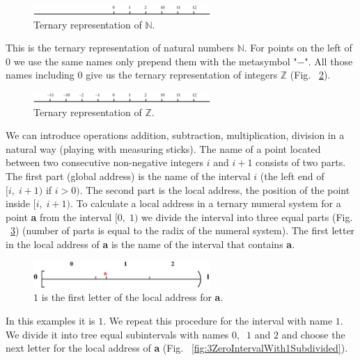 \documentclass[color=black,11pt]{elegantpaper}
\begin{document}
\begin{figure}[htbp]
  \centering
  \includegraphics[width=0.6\textwidth]{xfig_stuff/3natural.eps}
  \caption{Ternary representation of $\mathbb{N}.$} 
  \label{fig:3natural}
\end{figure}

 This is the ternary representation of natural numbers $\mathbb{N}.$ For points on the left of $0$ we use the same names only prepend them with the metasymbol "$-$". All those names including $0$ give us the ternary representation of integers $\mathbb{Z}$ (Fig. ~\ref{fig:3integers}).
\begin{figure}[htbp]
  \centering
  \includegraphics[width=0.6\textwidth]{xfig_stuff/3integers.eps}
  \caption{Ternary representation of $\mathbb{Z}.$} 
  \label{fig:3integers}
\end{figure}
We can introduce operations addition, subtraction, multiplication, division in a natural way (playing with measuring sticks).
The name of a point located between two consecutive non-negative integers $i$ and $i+1$ consists of two parts. The first part (global address) is the name of the interval $i$ (the left end of $[i,\; i+1)$ if $i>0).$ The second part is the local address, the position of the point inside $[i,\;i+1).$ 
To calculate a local address in a ternary numeral system for a point {\bf \color{red} a} from the interval $[0,\;1)$ we divide the interval into three equal parts (Fig. ~\ref{fig:3ZeroInterval}) (number of parts is equal to the radix of the numeral system). The first letter in the local address of {\bf \color{red} a} is the name of the interval that contains {\bf \color{red} a}.
\begin{figure}[htbp]
  \centering
  \includegraphics[width=0.6\textwidth]{xfig_stuff/3ZeroInterval.eps}
  \caption{$1$ is the first letter of the local address for {\bf \color{red} a}.} 
  \label{fig:3ZeroInterval}
\end{figure}
In this examples it is $1.$ We repeat this procedure for the interval with name $1.$ We divide it into tree equal subintervals with names $0,\;\;1$ and $2$ and choose the next letter for the local address of {\bf \color{red} a} (Fig. ~\ref{fig:3ZeroIntervalWith1Subdivided}).
\end{document}
